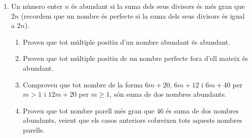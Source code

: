 \begin{enumerate}[leftmargin=*]
\item Un número enter $n$ és abundant si la suma dels seus
divisors és més gran que $2n$ (recordem que un nombre és perfecte si
la suma dels seus divisors és igual a $2n$).
\begin{enumerate}
\item Proveu que tot múltiple positiu d'un nombre abundant és abundant.
\item Proveu que tot múltiple positiu de un nombre perfecte fora d'ell mateix és abundant.
\item Comproveu que tot nombre de la forma $6m+20$, $6m+12$ i $6m+40$ per $m>1$ i
$12m+20$ per $m\ge 1$, són suma de dos nombres abundants.
\item Proveu que tot nombre parell més gran que $46$ és suma de dos
nombres abundants, veient que els casos anteriors cobreixen tots
aquests nombres parells.
\end{enumerate}

\end{enumerate}